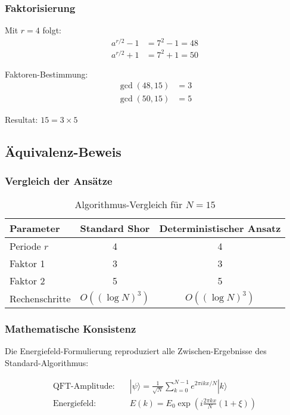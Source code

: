 \documentclass[12pt,a4paper]{report}
\begin{document}
	\subsubsection{Faktorisierung}
	
	Mit $r = 4$ folgt:
	\begin{align}
		a^{r/2} - 1 &= 7^2 - 1 = 48 \\
		a^{r/2} + 1 &= 7^2 + 1 = 50
	\end{align}
	
	Faktoren-Bestimmung:
	\begin{align}
		\gcd(48, 15) &= 3 \\
		\gcd(50, 15) &= 5
	\end{align}
	
	Resultat: $15 = 3 \times 5$
	
	\subsection{Äquivalenz-Beweis}
	
	\subsubsection{Vergleich der Ansätze}
	
	\begin{table}[htbp]
		\centering
		\begin{tabular}{lcc}
			\toprule
			\textbf{Parameter} & \textbf{Standard Shor} & \textbf{Deterministischer Ansatz} \\
			\midrule
			Periode $r$ & 4 & 4 \\
			Faktor 1 & 3 & 3 \\
			Faktor 2 & 5 & 5 \\
			Rechenschritte & $O((\log N)^3)$ & $O((\log N)^3)$ \\
			\bottomrule
		\end{tabular}
		\caption{Algorithmus-Vergleich für $N = 15$}
	\end{table}
	
	\subsubsection{Mathematische Konsistenz}
	
	Die Energiefeld-Formulierung reproduziert alle Zwischen-Ergebnisse des Standard-Algorithmus:
	
	\begin{align}
		\text{QFT-Amplitude:} \quad &|\psi\rangle = \frac{1}{\sqrt{N}} \sum_{k=0}^{N-1} e^{2\pi i k x / N} |k\rangle \\
		\text{Energiefeld:} \quad &E(k) = E_0 \exp\left(i \frac{2\pi k x}{N}(1 + \xi)\right)
	\end{align}
	
\end{document}
